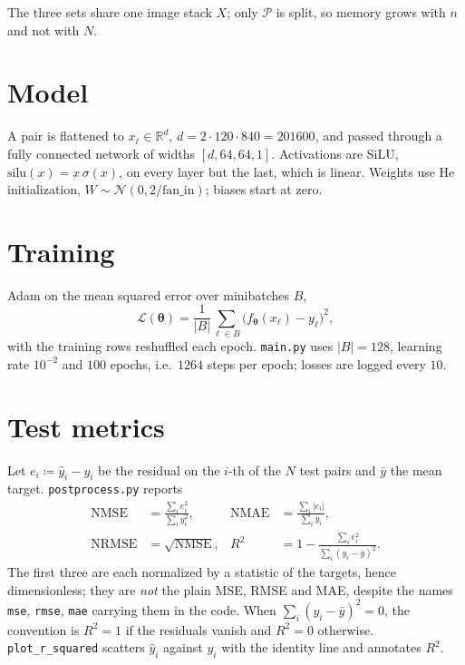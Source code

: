\documentclass[11pt]{article}
\newcommand{\R}{\mathbb{R}}
\begin{document}
The three sets share one image stack $X$; only $\mathcal{P}$ is split, so
memory grows with $n$ and not with $N$.

\section{Model}

A pair is flattened to $x_\ell \in \R^{d}$, $d = 2 \cdot 120 \cdot 840 =
201600$, and passed through a fully connected network of widths $[d, 64, 64,
1]$. Activations are SiLU, $\mathrm{silu}(x) = x\,\sigma(x)$, on every layer but
the last, which is linear. Weights use He initialization,
$W \sim \mathcal{N}(0, 2/\mathrm{fan\_in})$; biases start at zero.

\section{Training}

Adam on the mean squared error over minibatches $B$,
%
\begin{equation}
  \mathcal{L}(\boldsymbol\theta)
  = \frac{1}{|B|} \sum_{\ell \in B}
    \bigl( f_{\boldsymbol\theta}(x_\ell) - y_\ell \bigr)^2 ,
  \label{eq:loss}
\end{equation}
%
with the training rows reshuffled each epoch. \texttt{main.py} uses
$|B| = 128$, learning rate $10^{-2}$ and $100$ epochs, i.e.\ $1264$ steps per
epoch; losses are logged every $10$.

\section{Test metrics}

Let $e_i \coloneqq \hat{y}_i - y_i$ be the residual on the $i$-th of the $N$
test pairs and $\bar{y}$ the mean target. \texttt{postprocess.py} reports
%
\begin{align}
  \mathrm{NMSE} &= \frac{\sum_i e_i^2}{\sum_i y_i^2},
  &
  \mathrm{NMAE} &= \frac{\sum_i |e_i|}{\sum_i y_i},
  \label{eq:nmse} \\[4pt]
  \mathrm{NRMSE} &= \sqrt{\mathrm{NMSE}},
  &
  R^2 &= 1 - \frac{\sum_i e_i^2}{\sum_i (y_i - \bar{y})^2} .
  \label{eq:r2}
\end{align}
%
The first three are each normalized by a statistic of the targets, hence
dimensionless; they are \emph{not} the plain MSE, RMSE and MAE, despite the
names \texttt{mse}, \texttt{rmse}, \texttt{mae} carrying them in the code. When
$\sum_i (y_i - \bar{y})^2 = 0$, the convention is $R^2 = 1$ if the residuals
vanish and $R^2 = 0$ otherwise.
\texttt{plot\_r\_squared} scatters $\hat{y}_i$ against $y_i$ with the identity
line and annotates $R^2$.
\end{document}
